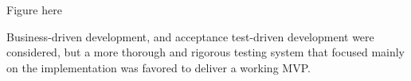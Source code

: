 Figure here


Business-driven development, and acceptance test-driven development were considered, but a more thorough and rigorous testing system that focused mainly on the implementation was favored to deliver a working MVP.






